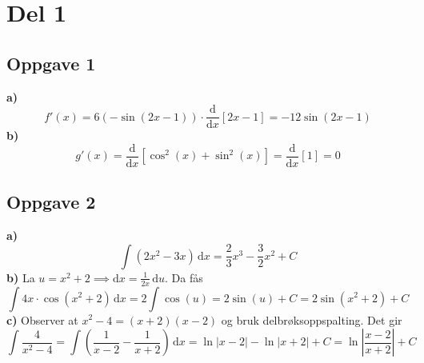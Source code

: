 


\newcommand{\fagkode}{R2}
\newcommand{\semesteraar}{høsten 2018}
\newcommand{\forfatter}{Markus}
\newcommand{\dokumenttittel}{Løsningsforslag -- Eksamen \fagkode, \semesteraar}

\usepackage{siunitx}


\newcommand{\logonavn}{}






\section{Del 1}
\subsection{Oppgave 1}
\textbf{a)} $$f'(x)=6(-\sin(2x-1)) \cdot \frac{\text{d}}{\text{d}x}\left[2x-1\right]=-12\sin(2x-1)$$ 
\textbf{b)} $$g'(x)=\frac{\text{d}}{\text{d}x}\left[\cos^2(x)+\sin^2(x) \right] = \frac{\text{d}}{\text{d}x}[1] = 0$$

\subsection{Oppgave 2}
\textbf{a)} $$ \int \left(2x^2-3x\right) \, \text{d}x = \frac23 x^3 - \frac32 x^2 + C$$ 
\textbf{b)} La $u=x^2+2 \implies \text{d}x = \frac{1}{2x} \, \text{d}u$. Da fås $$\int 4x \cdot \cos(x^2+2) \, \text{d}x = 2\int \cos(u) = 2\sin(u) + C = 2\sin(x^2+2) + C$$
\textbf{c)} Observer at $x^2-4=(x+2)(x-2)$ og bruk delbrøksoppspalting. Det gir $$\int \frac{4}{x^2-4} = \int \left(\frac{1}{x-2} - \frac{1}{x+2} \right) \, \text{d}x = \ln|x-2| - \ln|x+2| + C = \ln \left| \frac{x-2}{x+2}\right| + C$$

